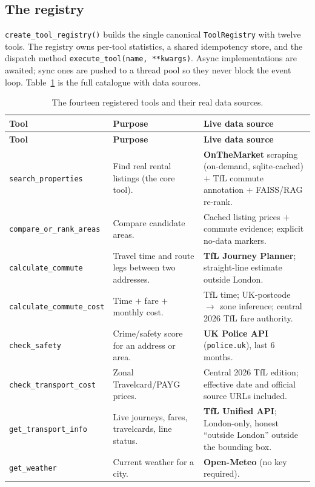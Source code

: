\documentclass[11pt,a4paper]{article}
\newcommand{\code}[1]{\texttt{\small #1}}
\begin{document}
\subsection{The registry}
\code{create\_tool\_registry()} builds the single canonical \code{ToolRegistry} with
twelve tools. The registry owns per-tool statistics, a shared idempotency store, and
the dispatch method \code{execute\_tool(name, **kwargs)}. Async implementations are
awaited; sync ones are pushed to a thread pool so they never block the event loop.
Table~\ref{tab:tools} is the full catalogue with data sources.

\begin{longtable}{@{}p{} p{} p{}@{}}
\caption{The fourteen registered tools and their real data sources.}\label{tab:tools}\\
\toprule
\textbf{Tool} & \textbf{Purpose} & \textbf{Live data source}\\
\midrule
\endfirsthead
\toprule
\textbf{Tool} & \textbf{Purpose} & \textbf{Live data source}\\
\midrule
\endhead
\code{search\_properties} & Find real rental listings (the core tool). & \textbf{OnTheMarket} scraping (on-demand, sqlite-cached) $+$ TfL commute annotation $+$ FAISS/RAG re-rank.\\
\code{compare\_or\_rank\_areas} & Compare candidate areas. & Cached listing prices $+$ commute evidence; explicit no-data markers.\\
\code{calculate\_commute} & Travel time and route legs between two addresses. & \textbf{TfL Journey Planner}; straight-line estimate outside London.\\
\code{calculate\_commute\_cost} & Time $+$ fare $+$ monthly cost. & TfL time; UK-postcode $\to$ zone inference; central 2026 TfL fare authority.\\
\code{check\_safety} & Crime/safety score for an address or area. & \textbf{UK Police API} (\code{police.uk}), last 6 months.\\
\code{check\_transport\_cost} & Zonal Travelcard/PAYG prices. & Central 2026 TfL edition; effective date and official source URLs included.\\
\code{get\_transport\_info} & Live journeys, fares, travelcards, line status. & \textbf{TfL Unified API}; London-only, honest ``outside London'' outside the bounding box.\\
\code{get\_weather} & Current weather for a city. & \textbf{Open-Meteo} (no key required).\\

\end{longtable}
\end{document}

